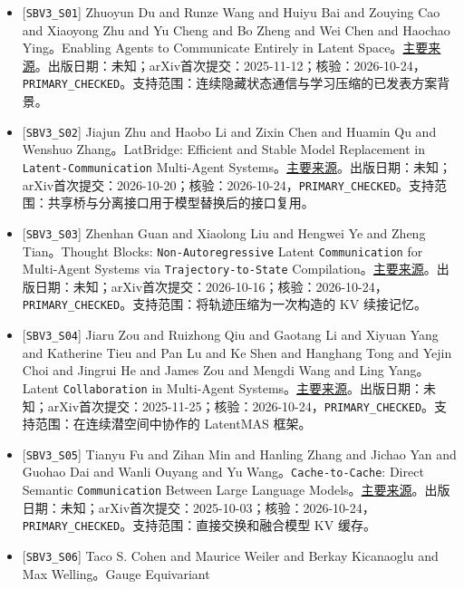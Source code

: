 \documentclass[
  10pt,
]{article}
\begin{document}
\begin{itemize}
\item
  {[}\nolinkurl{SBV3_S01}{]} Zhuoyun Du and Runze Wang and Huiyu Bai and
  Zouying Cao and Xiaoyong Zhu and Yu Cheng and Bo Zheng and Wei Chen
  and Haochao Ying。Enabling Agents to Communicate Entirely in Latent
  Space。\href{https://arxiv.org/abs/2511.09149}{主要来源}。出版日期：未知；arXiv首次提交：2025-11-12；核验：2026-10-24，\nolinkurl{PRIMARY_CHECKED}。支持范围：连续隐藏状态通信与学习压缩的已发表方案背景。
\item
  {[}\nolinkurl{SBV3_S02}{]} Jiajun Zhu and Haobo Li and Zixin Chen and
  Huamin Qu and Wenshuo Zhang。LatBridge: Efficient and Stable Model
  Replacement in \nolinkurl{Latent-Communication} Multi-Agent
  Systems。\href{https://arxiv.org/abs/2610.27813}{主要来源}。出版日期：未知；arXiv首次提交：2026-10-20；核验：2026-10-24，\nolinkurl{PRIMARY_CHECKED}。支持范围：共享桥与分离接口用于模型替换后的接口复用。
\item
  {[}\nolinkurl{SBV3_S03}{]} Zhenhan Guan and Xiaolong Liu and Hengwei
  Ye and Zheng Tian。Thought Blocks: \nolinkurl{Non-Autoregressive}
  Latent \nolinkurl{Communication} for Multi-Agent Systems via
  \nolinkurl{Trajectory-to-State}
  Compilation。\href{https://arxiv.org/abs/2610.23056}{主要来源}。出版日期：未知；arXiv首次提交：2026-10-16；核验：2026-10-24，\nolinkurl{PRIMARY_CHECKED}。支持范围：将轨迹压缩为一次构造的
  KV 续接记忆。
\item
  {[}\nolinkurl{SBV3_S04}{]} Jiaru Zou and Ruizhong Qiu and Gaotang Li
  and Xiyuan Yang and Katherine Tieu and Pan Lu and Ke Shen and Hanghang
  Tong and Yejin Choi and Jingrui He and James Zou and Mengdi Wang and
  Ling Yang。Latent \nolinkurl{Collaboration} in Multi-Agent
  Systems。\href{https://arxiv.org/abs/2511.20639}{主要来源}。出版日期：未知；arXiv首次提交：2025-11-25；核验：2026-10-24，\nolinkurl{PRIMARY_CHECKED}。支持范围：在连续潜空间中协作的
  LatentMAS 框架。
\item
  {[}\nolinkurl{SBV3_S05}{]} Tianyu Fu and Zihan Min and Hanling Zhang
  and Jichao Yan and Guohao Dai and Wanli Ouyang and Yu
  Wang。\nolinkurl{Cache-to-Cache}: Direct Semantic
  \nolinkurl{Communication} Between Large Language
  Models。\href{https://arxiv.org/abs/2510.03215}{主要来源}。出版日期：未知；arXiv首次提交：2025-10-03；核验：2026-10-24，\nolinkurl{PRIMARY_CHECKED}。支持范围：直接交换和融合模型
  KV 缓存。
\item
  {[}\nolinkurl{SBV3_S06}{]} Taco S. Cohen and Maurice Weiler and Berkay
  Kicanaoglu and Max Welling。Gauge Equivariant

\end{itemize}
\end{document}
